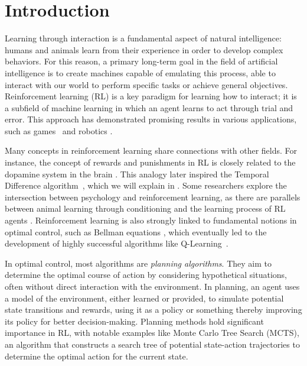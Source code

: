 \chapter{Introduction}
Learning through interaction is a fundamental aspect of natural intelligence: humans and animals learn from their experience in order to develop complex behaviors. For this reason, a primary long-term goal in the field of artificial intelligence is to create machines capable of emulating this process, able to interact with our world to perform specific tasks or achieve general objectives. Reinforcement learning (RL) is a key paradigm for learning how to interact; it is a subfield of machine learning in which an agent learns to act through trial and error. This approach has demonstrated promising results in various applications, such as games~\citep{tesauro1994td, mnih2013playing, silver2016mastering} and robotics \citep{levine2018learning}.

Many concepts in reinforcement learning share connections with other fields. For instance, the concept of rewards and punishments in RL is closely related to the dopamine system in the brain \citep{schultz1997neural}. This analogy later inspired the Temporal Difference algorithm~\citep{sutton1988learning}, which we will explain in . Some researchers explore the intersection between psychology and reinforcement learning, as there are parallels between animal learning through conditioning and the learning process of RL agents \citep{sutton1981toward}. Reinforcement learning is also strongly linked to fundamental notions in optimal control, such as Bellman equations \citep{bellman1954theory, bellman1959adaptive}, which eventually led to the development of highly successful algorithms like Q-Learning~\citep{watkins1992q}.

In optimal control, most algorithms are \emph{planning algorithms}. They aim to determine the optimal course of action by considering hypothetical situations, often without direct interaction with the environment. In planning, an agent uses a model of the environment, either learned or provided, to simulate potential state transitions and rewards, {\color{red} using it as a policy or something} thereby improving its policy for better decision-making. Planning methods hold significant importance in RL, with notable examples like Monte Carlo Tree Search (MCTS), an algorithm that constructs a search tree of potential state-action trajectories to determine the optimal action for the current state.

